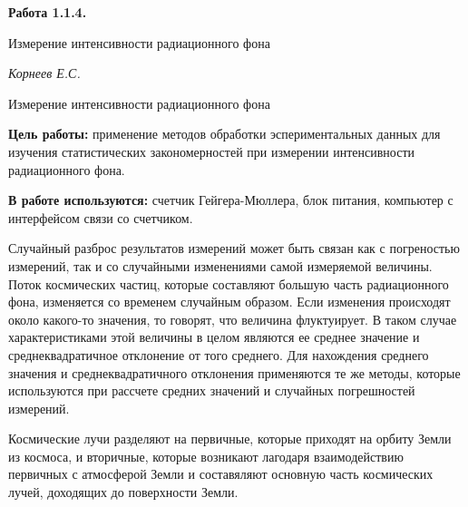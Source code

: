 \documentclass[14pt]{article}
\begin{document}
\begin{titlepage}
	\begin{center}
		\fontsize{18pt}{20pt}\selectfont
		\textbf{Работа 1.1.4.}	
	
		\vspace{5cm}
		\fontsize{24pt}{25pt}\selectfont
		Измерение интенсивности радиационного фона
	\end{center}
	\begin{flushright}
		\fontsize{18pt}{20pt}\selectfont
		\vspace{14cm}
		\hspace{-3cm}
		\textit{Корнеев Е.С.}
	\end{flushright}		
\end{titlepage}

\begin{center}
	\fontsize{16pt}{18pt}\selectfont	
	Измерение интенсивности радиационного фона
\end{center}

\fontsize{14pt}{16pt}\selectfont
\vspace{1cm}
\textbf{Цель работы:} применение методов обработки эспериментальных данных для изучения статистических закономерностей при измерении интенсивности радиационного фона.

\vspace{0.5cm}
\textbf{В работе используются:} счетчик Гейгера-Мюллера, блок питания, компьютер с интерфейсом связи со счетчиком.

\vspace{1cm}
Случайный разброс результатов измерений может быть связан как с погреностью измерений, так и со случайными изменениями самой измеряемой величины. Поток космических частиц, которые составляют большую часть радиационного фона, изменяется со временем случайным образом. Если изменения происходят около какого-то значения, то говорят, что величина флуктуирует. В таком случае характеристиками этой величины в целом являются ее среднее значение и среднеквадратичное отклонение от того среднего. Для нахождения среднего значения и среднеквадратичного отклонения применяются те же методы, которые используются при рассчете средних значений и случайных погрешностей измерений.

\vspace{0.5cm}
Космические лучи разделяют на первичные, которые приходят на орбиту Земли из космоса, и вторичные, которые возникают лагодаря взаимодействию первичных с атмосферой Земли и составяляют основную часть космических лучей, доходящих до поверхности Земли. 
\end{document}
